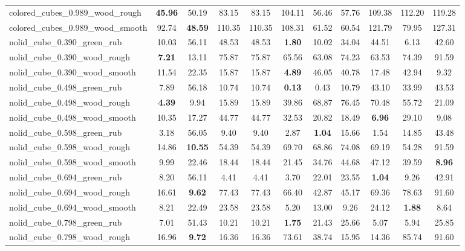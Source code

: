 \begin{table}[H]
{\begin{tabular}{l cccccccccc}
        colored\_cubes\_0.989\_wood\_rough & \textbf{45.96} & 50.19 & 83.15 & 83.15 & 104.11 & 56.46 & 57.76 & 109.38 & 112.20 & 119.28 \\
        colored\_cubes\_0.989\_wood\_smooth & 92.74 & \textbf{48.59} & 110.35 & 110.35 & 108.31 & 61.52 & 60.54 & 121.79 & 79.95 & 127.31 \\
        nolid\_cube\_0.390\_green\_rub & 10.03 & 56.11 & 48.53 & 48.53 & \textbf{1.80} & 10.02 & 34.04 & 44.51 & 6.13 & 42.60 \\
        nolid\_cube\_0.390\_wood\_rough & \textbf{7.21} & 13.11 & 75.87 & 75.87 & 65.56 & 63.08 & 74.23 & 63.53 & 74.39 & 91.59 \\
        nolid\_cube\_0.390\_wood\_smooth & 11.54 & 22.35 & 15.87 & 15.87 & \textbf{4.89} & 46.05 & 40.78 & 17.48 & 42.94 & 9.32 \\
        nolid\_cube\_0.498\_green\_rub & 7.89 & 56.18 & 10.74 & 10.74 & \textbf{0.13} & 0.43 & 10.79 & 43.10 & 33.99 & 43.53 \\
        nolid\_cube\_0.498\_wood\_rough & \textbf{4.39} & 9.94 & 15.89 & 15.89 & 39.86 & 68.87 & 76.45 & 70.48 & 55.72 & 21.09 \\
        nolid\_cube\_0.498\_wood\_smooth & 10.35 & 17.27 & 44.77 & 44.77 & 32.53 & 20.82 & 18.49 & \textbf{6.96} & 29.10 & 9.08 \\
        nolid\_cube\_0.598\_green\_rub & 3.18 & 56.05 & 9.40 & 9.40 & 2.87 & \textbf{1.04} & 15.66 & 1.54 & 14.85 & 43.48 \\
        nolid\_cube\_0.598\_wood\_rough & 14.86 & \textbf{10.55} & 54.39 & 54.39 & 69.70 & 68.86 & 74.08 & 69.19 & 54.28 & 91.59 \\
        nolid\_cube\_0.598\_wood\_smooth & 9.99 & 22.46 & 18.44 & 18.44 & 21.45 & 34.76 & 44.68 & 47.12 & 39.59 & \textbf{8.96} \\
        nolid\_cube\_0.694\_green\_rub & 8.20 & 56.11 & 4.41 & 4.41 & 3.70 & 22.01 & 23.55 & \textbf{1.04} & 9.26 & 42.91 \\
        nolid\_cube\_0.694\_wood\_rough & 16.61 & \textbf{9.62} & 77.43 & 77.43 & 66.40 & 42.87 & 45.17 & 69.36 & 78.63 & 91.60 \\
        nolid\_cube\_0.694\_wood\_smooth & 8.21 & 22.49 & 23.58 & 23.58 & 5.20 & 13.00 & 9.26 & 24.12 & \textbf{1.88} & 8.64 \\
        nolid\_cube\_0.798\_green\_rub & 7.01 & 51.43 & 10.21 & 10.21 & \textbf{1.75} & 21.43 & 25.66 & 5.07 & 5.94 & 25.85 \\
        nolid\_cube\_0.798\_wood\_rough & 16.96 & \textbf{9.72} & 16.36 & 16.36 & 73.61 & 38.74 & 15.95 & 14.36 & 85.74 & 91.60 \\

\end{tabular}}
\end{table}
